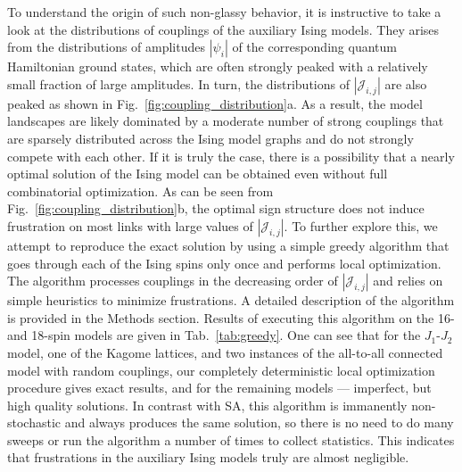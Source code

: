 To understand the origin of such non-glassy behavior, it is instructive to take a look at the distributions of couplings of the auxiliary Ising models. They arises from the distributions of amplitudes $|\psi_i|$ of the corresponding quantum Hamiltonian ground states, which are often strongly peaked with a relatively small fraction of large amplitudes. In turn, the distributions of $|\mathcal{J}_{i,j}|$ are also peaked as shown in Fig.~\ref{fig:coupling_distribution}a. As a result, the model landscapes are likely dominated by a moderate number of strong couplings that are sparsely distributed across the Ising model graphs and do not strongly compete with each other. If it is truly the case, there is a possibility that a nearly optimal solution of the Ising model can be obtained even without full combinatorial optimization. As can be seen from Fig.~\ref{fig:coupling_distribution}b, the optimal sign structure does not induce frustration on most links with large values of $|\mathcal{J}_{i,j}|$. To further explore this, we attempt to reproduce the exact solution by using a simple greedy algorithm that goes through each of the Ising spins only once and performs local optimization. The algorithm processes couplings in the decreasing order of $|\mathcal{J}_{i,j}|$ and relies on simple heuristics to minimize frustrations. A detailed description of the algorithm is provided in the Methods section. Results of executing this algorithm on the 16- and 18-spin models are given in Tab.~\ref{tab:greedy}. One can see that for the $J_1$-$J_2$ model, one of the Kagome lattices, and two instances of the all-to-all connected model with random couplings, our completely deterministic local optimization procedure gives exact results, and for the remaining models --- imperfect, but high quality solutions. In contrast with SA, this algorithm is immanently non-stochastic and always produces the same solution, so there is no need to do many sweeps or run the algorithm a number of times to collect statistics. This indicates that frustrations in the auxiliary Ising models truly are almost negligible.

